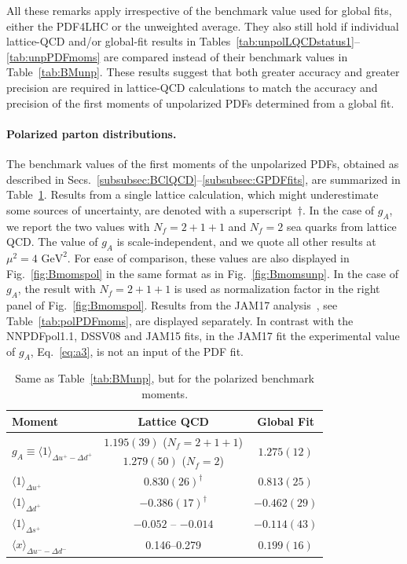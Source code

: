 All these remarks apply irrespective of the benchmark value used for 
global fits, either the PDF4LHC or the unweighted average.
%
They also still hold if individual lattice-QCD and/or global-fit
results in Tables~\ref{tab:unpolLQCDstatus1}--\ref{tab:unpPDFmoms} are 
compared instead of their benchmark values in Table~\ref{tab:BMunp}. 
%
These results suggest that both greater accuracy and greater precision are
required in lattice-QCD calculations to match the accuracy and 
precision of the first moments of unpolarized PDFs determined from a global
fit.

\paragraph{Polarized parton distributions.}
%
The benchmark values of the first moments of the unpolarized PDFs, obtained
as described in Secs.~\ref{subsubsec:BClQCD}--\ref{subsubsec:GPDFfits}, 
are summarized in Table~\ref{tab:BMpol}.
%
Results from a single lattice calculation, which might underestimate some 
sources of uncertainty, are denoted with a superscript~$\dagger$.
%
In the case of $g_A$, we report the two values with $N_f=2+1+1$ and
$N_f=2$ sea quarks from lattice QCD.
%
The value of $g_A$ is scale-independent, and we quote all other results at 
$\mu^2=4\mbox{ GeV}^2$.
%
For ease of comparison, these values are also displayed in 
Fig.~\ref{fig:Bmomspol} in the same format as in Fig.~\ref{fig:Bmomsunp}.
%
In the case of $g_A$, the result with $N_f=2+1+1$ is used as normalization
factor in the right panel of Fig.~\ref{fig:Bmomspol}.
%
Results from the JAM17 analysis~\cite{Ethier:2017zbq}, see 
Table~\ref{tab:polPDFmoms}, are displayed separately.
%
In contrast with the NNPDFpol1.1, DSSV08 and JAM15 fits, in the JAM17 fit 
the experimental value of $g_A$, Eq.~\eqref{eq:a3}, 
is not an input of the PDF fit.

\begin{table}[!t]
\centering
\renewcommand{\arraystretch}{1.2}
\begin{tabular}{lcc}
\toprule
Moment & Lattice QCD & Global Fit\\
\midrule
\multirow{2}{*}{$g_A\equiv\langle 1\rangle_{\Delta u^+ - \Delta d^+}$} 
& $1.195(39)$ ($N_f=2+1+1$) 
& \multirow{2}{*}{$1.275(12)$} \\
& $1.279(50)$ ($N_f=2$) & \\
$\langle 1 \rangle_{\Delta u^+}$     
& $0.830(26)^\dagger$ 
& $0.813(25)$\\
$\langle 1 \rangle_{\Delta d^+}$     
& $-0.386(17)^\dagger$ 
& $-0.462(29)$\\
$\langle 1 \rangle_{\Delta s^+}$     
& $-0.052$ -- $-0.014$
& $-0.114(43)$\\
$\langle x\rangle_{\Delta u^- - \Delta d^-}$       
& \numrange{0.146}{0.279} 
& $0.199(16)$\\
\bottomrule
\end{tabular}
\caption{\small Same as Table~\ref{tab:BMunp}, but for the polarized benchmark 
moments.}
\label{tab:BMpol}
\end{table}


